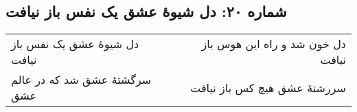 \begin{center}
\section*{شماره ۲۰: دل شیوۀ عشق یک نفس باز نیافت}
\label{sec:020}
\begin{longtable}{l p{0.5cm} r}
دل شیوهٔ عشق یک نفس باز نیافت
&&
دل خون شد و راه این هوس باز نیافت
\\
سرگشتهٔ عشق شد که در عالم عشق
&&
سررشتهٔ عشق هیچ کس باز نیافت
\\
\end{longtable}
\end{center}
